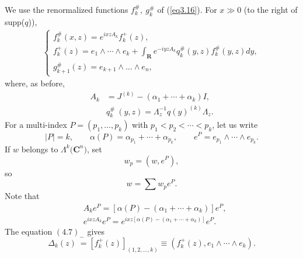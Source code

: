 \documentclass{surv-l}
\theoremstyle{plain}
\theoremstyle{definition}
\numberwithin{equation}{chapter}
\begin{document}
We use the renormalized functions $f_{k}^{\#},\ g_{k}^{\#}$ of (\ref{eq3.16}). For $x\gg 0$ (to the right of supp($q$)),
\begin{align}\label{eq19.2}
\left\{\begin{array}{l}
f_{k}^{\#}(x,z)=e^{ixzA_{k}}f_{k}^{+}(z),\\
f_{k}^{+}(z)=e_{1}\wedge\cdots\wedge e_{k}+\int_{\mathbf{R}}e^{-iyzA_{k}}q_{k}^{\#}(y, z)f_{k}^{\#}(y, z) dy,\\
g_{k+1}^{\#}(z)=e_{k+1}\wedge\ldots \wedge e_{n},
\end{array}\right.
\end{align}
where, as before,
\begin{align*}
A_{k}&=J^{(k)}-(\alpha_{1}+\cdots+\alpha_{k})I,\\
&q_{k}^{\#}\ (y,z)=\Lambda_{z}^{-1}q(y)^{(k)}\Lambda_{z}.
\end{align*}
For a multi-index $P= (p_{1}, \ldots, p_{k})$ with $p_{1}<p_{2}<\cdots<p_{k}$, let us write
\begin{equation*}
|P|=k,\qquad \alpha(P)=\alpha_{p_{1}}+\cdots+\alpha_{p_{k}},\qquad e^{P}=e_{p_{1}}\wedge\cdots\wedge e_{p_{k}}.
\end{equation*}
If $w$ belongs to $\Lambda^{k}\mathrm(\textbf{{C}}^{n})$, set
\begin{equation*}
w_{p}=(w, e^{P}),
\end{equation*}
so
\begin{equation*}
w=\sum w_{p}e^{P}.
\end{equation*}
Note that
\begin{align*}
&A_{k}e^{P}=[\alpha(P)-(\alpha_{1}+\cdots+\alpha_{k})]e^{P},\\
&e^{ixzA_{k}}e^{P}=e^{ixz[\alpha(P)-(\alpha_{1}+\cdots+\alpha_{k})]}e^{P}.
\end{align*}
The equation $(4.7)_{-}$ gives
\begin{equation}\label{eq19.3}
\Delta_{k}(z)\ =[f_{k}^{+}(z)]_{(1,2,\ldots,k)}\equiv(f_{k}^{+}(z), e_{1}\wedge\cdots\wedge e_{k}).
\end{equation}
\setcounter{theorem}{3}
\end{document}
